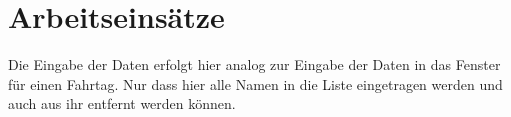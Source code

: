 \chapter{Arbeitseinsätze}
Die Eingabe der Daten erfolgt hier analog zur Eingabe der Daten in das Fenster für einen Fahrtag.
Nur dass hier alle Namen in die Liste eingetragen werden und auch aus ihr entfernt werden können.

